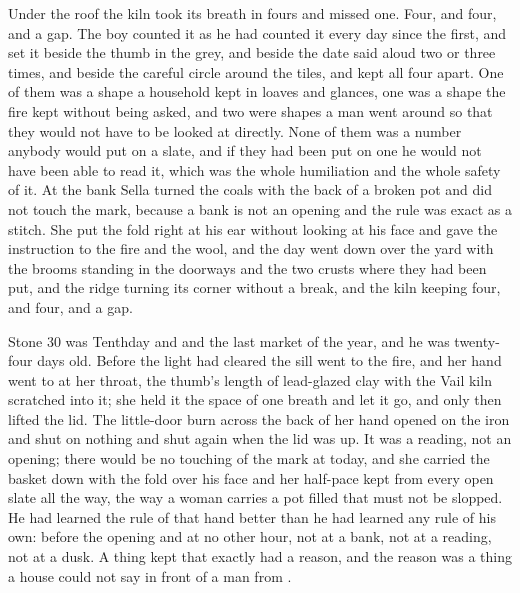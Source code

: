 Under the roof the kiln took its breath in fours and missed one. Four, and four, and a gap. The boy counted it as he had counted it every day since the first, and set it beside the thumb in the grey, and beside the date said aloud two or three times, and beside the careful circle around the tiles, and kept all four apart. One of them was a shape a household kept in loaves and glances, one was a shape the fire kept without being asked, and two were shapes a man went around so that they would not have to be looked at directly. None of them was a number anybody would put on a slate, and if they had been put on one he would not have been able to read it, which was the whole humiliation and the whole safety of it. At the bank Sella turned the coals with the back of a broken pot and did not touch the mark, because a bank is not an opening and the rule was exact as a stitch. She put the fold right at his ear without looking at his face and gave the instruction to the fire and the wool, and the day went down over the yard with the brooms standing in the doorways and the two crusts where they had been put, and the ridge turning its corner without a break, and the kiln keeping four, and four, and a gap.

\scenebreak


Stone 30 was Tenthday and  and the last market of the year, and he was twenty-four days old. Before the light had cleared the sill  went to the fire, and her hand went to  at her throat, the thumb's length of lead-glazed clay with the Vail kiln scratched into it; she held it the space of one breath and let it go, and only then lifted the lid. The little-door burn across the back of her hand opened on the iron and shut on nothing and shut again when the lid was up. It was a reading, not an opening; there would be no touching of the mark at  today, and she carried the basket down with the fold over his face and her half-pace kept from every open slate all the way, the way a woman carries a pot filled that must not be slopped. He had learned the rule of that hand better than he had learned any rule of his own: before the opening and at no other hour, not at a bank, not at a reading, not at a dusk. A thing kept that exactly had a reason, and the reason was a thing a house could not say in front of a man from .

